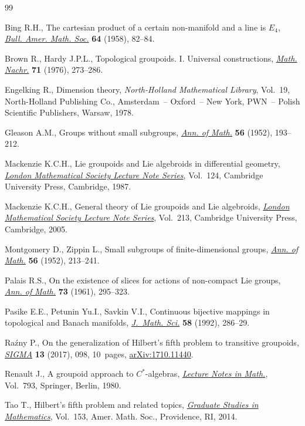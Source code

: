 \documentclass[pdftex]{sigma}
\begin{document}
\begin{thebibliography}{99}
\footnotesize\itemsep=0pt

Bing R.H., The cartesian product of a certain non-manifold and a line is
 {$E_{4}$}, \href{https://doi.org/10.1090/S0002-9904-1958-10160-3}{\textit{Bull. Amer. Math. Soc.}} \textbf{64} (1958), 82--84.

Brown R., Hardy J.P.L., Topological groupoids. {I}. {U}niversal constructions,
 \href{https://doi.org/10.1002/mana.19760710123}{\textit{Math. Nachr.}} \textbf{71} (1976), 273--286.

Engelking R., Dimension theory, \textit{North-Holland Mathematical Library},
 Vol.~19, North-Holland Publishing Co., Amsterdam~-- Oxford~-- New York,
 PWN~-- Polish Scientific Publishers, Warsaw, 1978.

Gleason A.M., Groups without small subgroups, \href{https://doi.org/10.2307/1969795}{\textit{Ann. of Math.}}
 \textbf{56} (1952), 193--212.

Mackenzie K.C.H., Lie groupoids and {L}ie algebroids in differential geometry,
 \href{https://doi.org/10.1017/CBO9780511661839}{\textit{London Mathematical Society Lecture Note Series}}, Vol.~124, Cambridge
 University Press, Cambridge, 1987.

Mackenzie K.C.H., General theory of {L}ie groupoids and {L}ie algebroids,
 \href{https://doi.org/10.1017/CBO9781107325883}{\textit{London Mathematical Society Lecture Note Series}}, Vol.~213, Cambridge
 University Press, Cambridge, 2005.

Montgomery D., Zippin L., Small subgroups of finite-dimensional groups,
 \href{https://doi.org/10.2307/1969796}{\textit{Ann. of Math.}} \textbf{56} (1952), 213--241.

Palais R.S., On the existence of slices for actions of non-compact {L}ie
 groups, \href{https://doi.org/10.2307/1970335}{\textit{Ann. of Math.}} \textbf{73} (1961), 295--323.

Pasike E.E., Petunin Yu.I., Savkin V.I., Continuous bijective mappings in
 topological and {B}anach manifolds, \href{https://doi.org/10.1007/BF01098343}{\textit{J.~Math. Sci.}} \textbf{58}
 (1992), 286--29.

Ra\'zny P., On the generalization of {H}ilbert's fifth problem to transitive
 groupoids, \href{https://doi.org/10.3842/SIGMA.2017.098}{\textit{SIGMA}} \textbf{13} (2017), 098, 10~pages,
 \href{https://arxiv.org/abs/1710.11440}{arXiv:1710.11440}.

Renault J., A groupoid approach to {$C^{\ast} $}-algebras, \href{https://doi.org/10.1007/BFb0091072}{\textit{Lecture
 Notes in Math.}}, Vol.~793, Springer, Berlin, 1980.

Tao T., Hilbert's fifth problem and related topics, \href{https://doi.org/10.1090/gsm/153}{\textit{Graduate Studies in
 Mathematics}}, Vol.~153, Amer. Math. Soc., Providence, RI, 2014.

\end{thebibliography}\LastPageEnding
\end{document}
